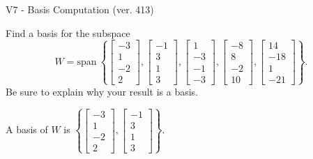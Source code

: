 \begin{exercise}
  \begin{exerciseTitle}V7 - Basis Computation (ver. 413)\end{exerciseTitle}
  \begin{exerciseStatement}
    Find a basis for the subspace 
\[W=\mathrm{span}\ \left\{\left[\begin{array}{r}
-3 \\
1 \\
-2 \\
2
\end{array}\right] , \left[\begin{array}{r}
-1 \\
3 \\
1 \\
3
\end{array}\right] , \left[\begin{array}{r}
1 \\
-3 \\
-1 \\
-3
\end{array}\right] , \left[\begin{array}{r}
-8 \\
8 \\
-2 \\
10
\end{array}\right] , \left[\begin{array}{r}
14 \\
-18 \\
1 \\
-21
\end{array}\right]\right\}.\]
 Be sure to explain why your result is a basis.


  \end{exerciseStatement}
  \begin{exerciseAnswer}
   A basis of \(W\) is  \(\left\{\left[\begin{array}{r}
-3 \\
1 \\
-2 \\
2
\end{array}\right] , \left[\begin{array}{r}
-1 \\
3 \\
1 \\
3
\end{array}\right]\right\}\).
  


  \end{exerciseAnswer}
\end{exercise}